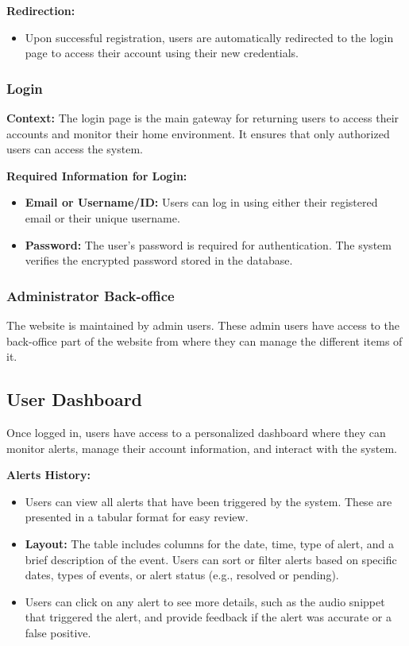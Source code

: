 \documentclass[conference]{IEEEtran}
\begin{document}
\textbf{Redirection:}
\begin{itemize}
    \item Upon successful registration, users are automatically redirected to the login page to access their account using their new credentials.
\end{itemize}

\subsubsection{Login}
\textbf{Context:} The login page is the main gateway for returning users to access their accounts and monitor their home environment. It ensures that only authorized users can access the system.

\textbf{Required Information for Login:}
\begin{itemize}
    \item \textbf{Email or Username/ID:} Users can log in using either their registered email or their unique username.
    \item \textbf{Password:} The user’s password is required for authentication. The system verifies the encrypted password stored in the database.
\end{itemize}


\subsubsection{Administrator Back-office}
The website is maintained by admin users. These admin users have access to the back-office part of the website from where they can manage the different items of it.



\subsection{User Dashboard}
Once logged in, users have access to a personalized dashboard where they can monitor alerts, manage their account information, and interact with the system.

\textbf{Alerts History:}
\begin{itemize}
    \item Users can view all alerts that have been triggered by the system. These are presented in a tabular format for easy review.
    \item \textbf{Layout:} The table includes columns for the date, time, type of alert, and a brief description of the event. Users can sort or filter alerts based on specific dates, types of events, or alert status (e.g., resolved or pending).
    \item Users can click on any alert to see more details, such as the audio snippet that triggered the alert, and provide feedback if the alert was accurate or a false positive.
\end{itemize}
\end{document}
